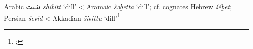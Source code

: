 \begin{etymology}\label{ety:shibitt}
Arabic {شبت} \textit{shibitt} `dill'
< Aramaic {} \textit{šəḇettā} `dill'; cf. cognates Hebrew  \textit{šéḇeṯ}; Persian  \textit{ševid} 
< Akkadian {} \textit{šibittu} `dill'\footnote{\textcite[1494-1495]{lane_arabic-english_1863}; }
\end{etymology}